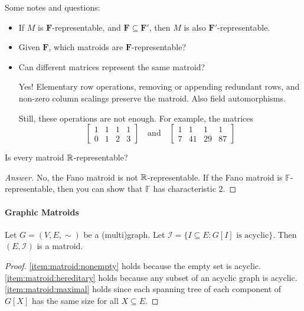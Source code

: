 Some notes and questions:
\begin{itemize}
    \item If \(M\) is \(\mathbf{F}\)-representable, and \(\mathbf{F} \subseteq \mathbf{F}'\), then \(M\) is also \(\mathbf{F}'\)-representable.
    \item Given \(\mathbf{F}\), which matroids are \(\mathbf{F}\)-representable?
    \item Can different matrices represent the same matroid?

    Yes! Elementary row operations, removing or appending redundant rows, and non-zero column scalings preserve the matroid. Also field automorphisms.

    Still, these operations are not enough. For example, the matrices
    \begin{equation}
        \begin{bmatrix}
            1 & 1 & 1 & 1 \\
            0 & 1 & 2 & 3
        \end{bmatrix}
        \quad \text{and} \quad
        \begin{bmatrix}
            1 & 1 & 1 & 1 \\
            7 & 41 & 29 & 87
        \end{bmatrix}
    \end{equation}
\end{itemize}

\begin{question}
    Is every matroid \(\mathbb{R}\)-representable?
\end{question}
\begin{proof}[Answer]
    No, the Fano matroid is not \(\mathbb{R}\)-representable.
    If the Fano matroid is \(\mathbb{F}\)-representable, then you can show that \(\mathbb{F}\) has characteristic \(2\).
\end{proof}


\paragraph{Graphic Matroids}

Let \(G = (V, E, \sim)\) be a (multi)graph.
Let \(\mathcal{I} = \{ I \subseteq E : G[I] \text{ is acyclic} \}\).
Then \((E, \mathcal{I})\) is a matroid.

\begin{proof}
    \ref{item:matroid:nonempty} holds because the empty set is acyclic.
    \ref{item:matroid:hereditary} holds because any subset of an acyclic graph is acyclic.
    \ref{item:matroid:maximal} holds since each spanning tree of each component of \(G[X]\) has the same size for all \(X \subseteq E\).
\end{proof}


